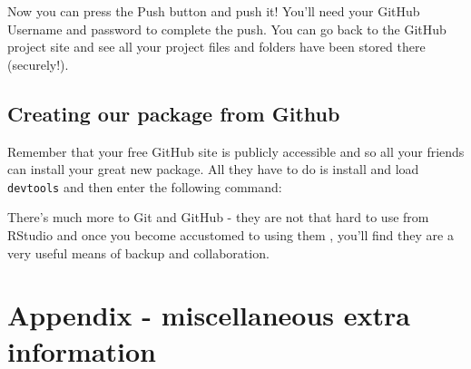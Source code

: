 \documentclass[titlepage]{book}\usepackage{knitr}
\begin{document}
Now you can press the Push button and push it! You'll need your GitHub Username and password to complete the push. You can go back to the GitHub project site and see all your project files and folders have been stored there (securely!).

\section{Creating our package from Github}
Remember that your free GitHub site is publicly accessible and so all your friends can install your great new package.  All they have to do is install and load  \texttt{devtools} and then enter the following command:

\begin{knitrout}
\color{fgcolor}\begin{kframe}
\begin{alltt}
\hlopt{::}\hlstd{(}\hlstd{)}
\end{alltt}
\end{kframe}
\end{knitrout}

There's much more to Git and GitHub - they are not that hard to use from RStudio and once you become accustomed to using them , you'll find they are a very useful means of backup and collaboration.












\chapter{Appendix - miscellaneous extra information}\label{Appendix}


\author{Brian Williams $<$\href{mailto:bjw649@gmail.com}%
{bjw649@gmail.com}$>$}
\end{document}
